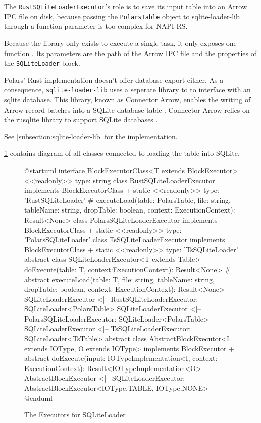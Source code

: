 The \Verb|RustSQLiteLoaderExecutor|'s role is to save its input table into an Arrow \ac{IPC} file on disk, because passing the \Verb|PolarsTable| object to sqlite-loader-lib through a function parameter is %
too complex for NAPI-RS.

Because the library only exists to execute a single task, it only exposes one function .
Its parameters are the path of the Arrow \ac{IPC} file and the properties of the \Verb|SQLiteLoader| block.

Polars' Rust implementation doesn't offer database export either. %
As a consequence, \Verb|sqlite-loader-lib| uses a seperate library to to interface with an sqlite database.
This library, known as Connector Arrow, enables the writing of Arrow record batches into a SQLite database table \autocite{connector-arrow}.
Connector Arrow relies on the rusqlite library to support SQLite databases \autocite{connector-arrow}.

See \ref{subsection:sqlite-loader-lib} for the implementation.


\ref{fig:uml:sqliteloaderexecutor:combined} contains diagram of all classes connected to loading the table into SQLite.

\begin{figure}
	\begin{plantuml}
		@startuml
		interface BlockExecutorClass<T extends BlockExecutor> {
				<<readonly>> type: string
			}
		class RustSQLiteLoaderExecutor implements BlockExecutorClass {
		+ {static} <<readonly>> type: 'RustSQLiteLoader'
		# executeLoad(table: PolarsTable, file: string, tableName: string, dropTable: boolean, context: ExecutionContext): Result<None>
		}
		class PolarsSQLiteLoaderExecutor implements BlockExecutorClass {
		+ {static} <<readonly>> type: 'PolarsSQLiteLoader'
		}
		class TsSQLiteLoaderExecutor implements BlockExecutorClass {
		+ {static} <<readonly>> type: 'TsSQLiteLoader'
		}
		abstract class SQLiteLoaderExecutor<T extends Table> {
		doExecute(table: T, context:ExecutionContext): Result<None>
		# {abstract} executeLoad(table: T, file: string, tableName: string, dropTable: boolean, context: ExecutionContext): Result<None>
		}
		SQLiteLoaderExecutor <|-- RustSQLiteLoaderExecutor: SQLiteLoader<PolarsTable>
		SQLiteLoaderExecutor <|-- PolarsSQLiteLoaderExecutor: SQLiteLoader<PolarsTable>
		SQLiteLoaderExecutor <|-- TsSQLiteLoaderExecutor: SQLiteLoader<TsTable>
		abstract class AbstractBlockExecutor<I extends IOType, O extends IOType> implements BlockExecutor {
		+ {abstract} doExecute(input: IOTypeImplementation<I\>, context: ExecutionContext): Result<IOTypeImplementation<O>\>
		}
		AbstractBlockExecutor <|-- SQLiteLoaderExecutor: AbstractBlockExecutor<IOType.TABLE, IOType.NONE>
		@enduml
	\end{plantuml}
	\caption{The Executors for SQLiteLoader}
	\label{fig:uml:sqliteloaderexecutor:combined}
\end{figure}


